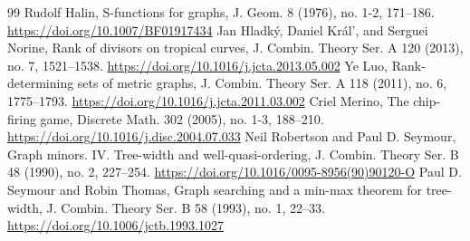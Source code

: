 \begin{thebibliography}{99}
 Rudolf Halin, S-functions for graphs, J. Geom. 8 (1976), no. 1-2, 171–186. \url{https://doi.org/10.1007/BF01917434}
 Jan Hladký, Daniel Král’, and Serguei Norine, Rank of divisors on tropical curves, J. Combin. Theory Ser. A 120 (2013), no. 7, 1521–1538. \url{https://doi.org/10.1016/j.jcta.2013.05.002}
 Ye Luo, Rank-determining sets of metric graphs, J. Combin. Theory Ser. A 118 (2011), no. 6, 1775–1793. \url{https://doi.org/10.1016/j.jcta.2011.03.002}
 Criel Merino, The chip-ﬁring game, Discrete Math. 302 (2005), no. 1-3, 188–210. \url{https://doi.org/10.1016/j.disc.2004.07.033}
 Neil Robertson and Paul D. Seymour, Graph minors. IV. Tree-width and well-quasi-ordering, J. Combin. Theory Ser. B 48 (1990), no. 2, 227–254. \url{https://doi.org/10.1016/0095-8956(90)90120-O}
 Paul D. Seymour and Robin Thomas, Graph searching and a min-max theorem for tree-width, J. Combin. Theory Ser. B 58 (1993), no. 1, 22–33. \url{https://doi.org/10.1006/jctb.1993.1027}
\end{thebibliography}
